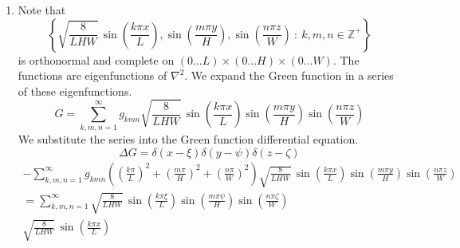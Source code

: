 {\begin{Solution}
\begin{enumerate}
\begin{multline*}
      \cos \left( \frac{ n \pi \psi }{ H } \right)
      \frac{2}{\sqrt{L H}} \sin \left( \frac{ (2m-1) \pi x }{ 2 L } \right)
      \cos \left( \frac{ n \pi y }{ H } \right)
    \end{multline*}
    We equate terms and solve for the coefficients $g_{m n}$.
    \begin{gather*}
      g_{m 0} = - \sqrt{ \frac{2}{L H} } 
      \left( \frac{ 2 L }{ (2m-1) \pi } \right)^2
      \sin \left( \frac{ (2m-1) \pi \xi }{ 2 L } \right) \\
      g_{m n} = - \frac{2}{\sqrt{L H}} 
      \frac{1}{ \pi^2 \left( \left( \frac{2m-1}{2L} \right)^2
          + \left( \frac{n}{H} \right)^2 \right) }
      \sin \left( \frac{ (2m-1) \pi \xi }{ 2 L } \right)
      \cos \left( \frac{ n \pi \psi }{ H } \right)
    \end{gather*}
    This determines the Green function.
  \item
    Note that 
    \[
    \left\{ \sqrt{ \frac{8}{L H W} }\,
      \sin \left( \frac{k \pi x}{L} \right),
      \sin \left( \frac{m \pi y}{H} \right),
      \sin \left( \frac{n \pi z}{W} \right) \ :\ 
      k,m,n \in \mathbb{Z}^+ \right\}
    \]
    is orthonormal and complete on 
    $(0 \ldots L) \times (0 \ldots H) \times (0 \ldots W)$.
    The functions are eigenfunctions of $\nabla^2$. 
    We expand the Green function in a series of these eigenfunctions.
    \[
    G = \sum_{k,m,n = 1}^\infty g_{k m n} \sqrt{ \frac{8}{L H W} }\,
    \sin \left( \frac{k \pi x}{L} \right)
    \sin \left( \frac{m \pi y}{H} \right)
    \sin \left( \frac{n \pi z}{W} \right)
    \]
    We substitute the series into the Green function differential
    equation.
    \[
    \Delta G = \delta(x - \xi) \delta(y - \psi) \delta(z - \zeta)
    \]
    \begin{multline*}
      - \sum_{k,m,n = 1}^\infty g_{k m n} 
      \left( \left( \frac{k \pi}{L} \right)^2 
        + \left( \frac{m \pi}{H} \right)^2
        +\left( \frac{n \pi}{W} \right)^2 \right)
      \sqrt{ \frac{8}{L H W} }\,
      \sin \left( \frac{k \pi x}{L} \right)
      \sin \left( \frac{m \pi y}{H} \right)
      \sin \left( \frac{n \pi z}{W} \right) 
      \\
      = \sum_{k,m,n = 1}^\infty 
      \sqrt{ \frac{8}{L H W} }\,
      \sin \left( \frac{k \pi \xi}{L} \right)
      \sin \left( \frac{m \pi \psi}{H} \right)
      \sin \left( \frac{n \pi \zeta}{W} \right) 
      \\
      \sqrt{ \frac{8}{L H W} }\,
      \sin \left( \frac{k \pi x}{L} \right)

\end{multline*}
\end{enumerate}
\end{Solution}}
